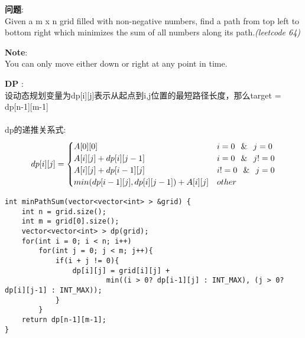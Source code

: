     
\begin{description}
    \item{\textbf{问题}}:\\
Given a m x n grid filled with non-negative numbers, find a path from top left to bottom right which minimizes the sum of all numbers along its path.\textit{(leetcode 64)}
    \item{\textbf{Note}}:\\
You can only move either down or right at any point in time.
    \item{\textbf{DP}} : 
    \\设动态规划变量为dp[i][j]表示从起点到i,j位置的最短路径长度，那么target = dp[n-1][m-1]\\
	\\dp的递推关系式:
$$
dp[i][j] =
\begin{cases} 
A[0][0] & i = 0 \,\And\, j = 0 \\
A[i][j]+dp[i][j-1] & i = 0 \,\And\, j != 0 \\
A[i][j]+dp[i-1][j] & i != 0 \,\And\, j = 0 \\
min(dp[i-1][j], dp[i][j-1]) + A[i][j] & other
\end{cases}
$$
    \begin{lstlisting}
int minPathSum(vector<vector<int> > &grid) {
	int n = grid.size();
	int m = grid[0].size();
	vector<vector<int> > dp(grid);
	for(int i = 0; i < n; i++)
		for(int j = 0; j < m; j++){
			if(i + j != 0){
				dp[i][j] = grid[i][j] + 
						min((i > 0? dp[i-1][j] : INT_MAX), (j > 0? dp[i][j-1] : INT_MAX));
			}
		}
	return dp[n-1][m-1];
}
    \end{lstlisting}
\end{description}

